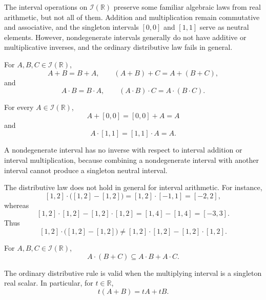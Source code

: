 \begin{remark*}[Exposition]
The interval operations on $\mathcal{I}(\mathbb{R})$ preserve some familiar
algebraic laws from real arithmetic, but not all of them. Addition and
multiplication remain commutative and associative, and the singleton intervals
$[0,0]$ and $[1,1]$ serve as neutral elements. However, nondegenerate intervals
generally do not have additive or multiplicative inverses, and the ordinary
distributive law fails in general.
\end{remark*}

\begin{proposition}
\cite{UnknownIntroductionIntervalAnalysis2002}
\label{prop:interval-addition-multiplication-commutative-associative}
For $A,B,C\in\mathcal{I}(\mathbb{R})$,
\[
A+B=B+A,
\qquad
(A+B)+C=A+(B+C),
\]
and
\[
A\cdot B=B\cdot A,
\qquad
(A\cdot B)\cdot C=A\cdot(B\cdot C).
\]
\end{proposition}

\begin{proposition}
\cite{UnknownIntroductionIntervalAnalysis2002}
\label{prop:neutral-intervals}
For every $A\in\mathcal{I}(\mathbb{R})$,
\[
A+[0,0]=[0,0]+A=A
\]
and
\[
A\cdot[1,1]=[1,1]\cdot A=A.
\]
\end{proposition}

\begin{remark*}
A nondegenerate interval has no inverse with respect to interval addition or
interval multiplication, because combining a nondegenerate interval with another
interval cannot produce a singleton neutral interval.
\end{remark*}

\begin{example}
\cite{UnknownIntroductionIntervalAnalysis2002}
\label{ex:failure-of-interval-distributivity}
The distributive law does not hold in general for interval arithmetic. For instance,
\[
[1,2]\cdot\bigl([1,2]-[1,2]\bigr)
=
[1,2]\cdot[-1,1]
=
[-2,2],
\]
whereas
\[
[1,2]\cdot[1,2]-[1,2]\cdot[1,2]
=
[1,4]-[1,4]
=
[-3,3].
\]
Thus
\[
[1,2]\cdot\bigl([1,2]-[1,2]\bigr)
\neq
[1,2]\cdot[1,2]-[1,2]\cdot[1,2].
\]
\end{example}

\begin{proposition}
\cite{UnknownIntroductionIntervalAnalysis2002}
\label{prop:interval-subdistributivity}
For $A,B,C\in\mathcal{I}(\mathbb{R})$,
\[
A\cdot(B+C)\subseteq A\cdot B+A\cdot C.
\]
\end{proposition}

\begin{remark*}
The ordinary distributive rule is valid when the multiplying interval is a
singleton real scalar. In particular, for $t\in\mathbb{R}$,
\[
t(A+B)=tA+tB.
\]
\end{remark*}
